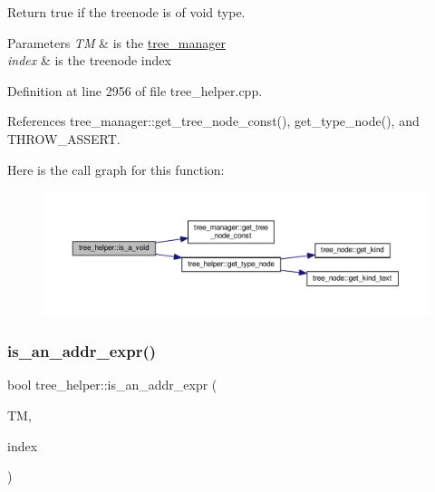 Return true if the treenode is of void type. 


\begin{DoxyParams}{Parameters}
{\em TM} & is the \hyperlink{classtree__manager}{tree\+\_\+manager} \\
\hline
{\em index} & is the treenode index \\
\hline
\end{DoxyParams}


Definition at line 2956 of file tree\+\_\+helper.\+cpp.



References tree\+\_\+manager\+::get\+\_\+tree\+\_\+node\+\_\+const(), get\+\_\+type\+\_\+node(), and T\+H\+R\+O\+W\+\_\+\+A\+S\+S\+E\+RT.

Here is the call graph for this function\+:
\nopagebreak
\begin{figure}[H]
\begin{center}
\leavevmode
\includegraphics[width=350pt]{d7/d99/classtree__helper_a262d8de0a44b4f37fa1ecfc0b14b79e8_cgraph}
\end{center}
\end{figure}
\mbox{\label{classtree__helper_a171004a12f78c6e98111be0d1c3b857a}} 
\subsubsection{\texorpdfstring{is\+\_\+an\+\_\+addr\+\_\+expr()}{is\_an\_addr\_expr()}}
{\footnotesize\ttfamily bool tree\+\_\+helper\+::is\+\_\+an\+\_\+addr\+\_\+expr (\begin{DoxyParamCaption}\item[{const \hyperlink{tree__manager_8hpp_a792e3f1f892d7d997a8d8a4a12e39346}{tree\+\_\+manager\+Const\+Ref} \&}]{TM,  }\item[{const unsigned int}]{index }\end{DoxyParamCaption})\hspace{0.3cm}{\ttfamily [static]}}




